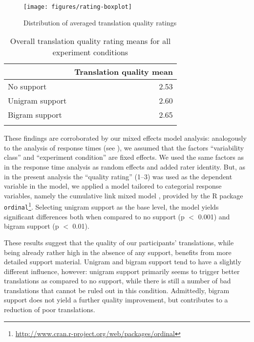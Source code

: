 \documentclass[output=paper]{LSP/langsci}
\begin{document}
\begin{figure}%
  \centering
  \texttt{[image: figures/rating-boxplot]}
  \caption{Distribution of averaged translation quality
    ratings}
  \label{fig:q-boxplot}
\end{figure}
%
\begin{table}[tb!]
  \begin{tabular*}{\textwidth}{@{\extracolsep{\fill}}lr@{}}
    \lsptoprule
    & Translation quality mean\\
    \midrule
    No support & 2.53\\
    Unigram support & 2.60\\
    Bigram support & 2.65\\
    \lspbottomrule
  \end{tabular*}
  \caption{Overall translation quality rating means for all experiment conditions}
  \label{tab:overall-quality-means}
\end{table}


\largerpage
These findings are corroborated by our mixed effects model analysis:
analogously to the analysis of response times (see
), we assumed that the factors
``variability class'' and ``experiment condition'' are fixed
effects. We used the same factors as in the response time analysis as
random effects and added rater identity. But, as in the present
analysis the ``quality rating'' (1--3) was used as the dependent
variable in the model, we applied a model tailored to categorial
response variables, namely the cumulative link mixed model
\citep{Christensen:11}, provided by the R package
\texttt{ordinal}\footnote{\url{http://www.cran.r-project.org/web/packages/ordinal}}.
%
Selecting unigram support as the base level, the model yields
significant differences both when compared to no support (p $<$ 0.001)
and bigram support (p $<$ 0.01).


These results suggest that the quality of our participants'
translations, while being already rather high in the absence of any
support, benefits from more detailed support material. Unigram and
bigram support tend to have a slightly different influence, however:
unigram support primarily seems to trigger better translations as
compared to no support, while there is still a number of bad
translations that cannot be ruled out in this condition. Admittedly,
bigram support does not yield a further quality improvement, but
contributes to a reduction of poor translations.
\end{document}
